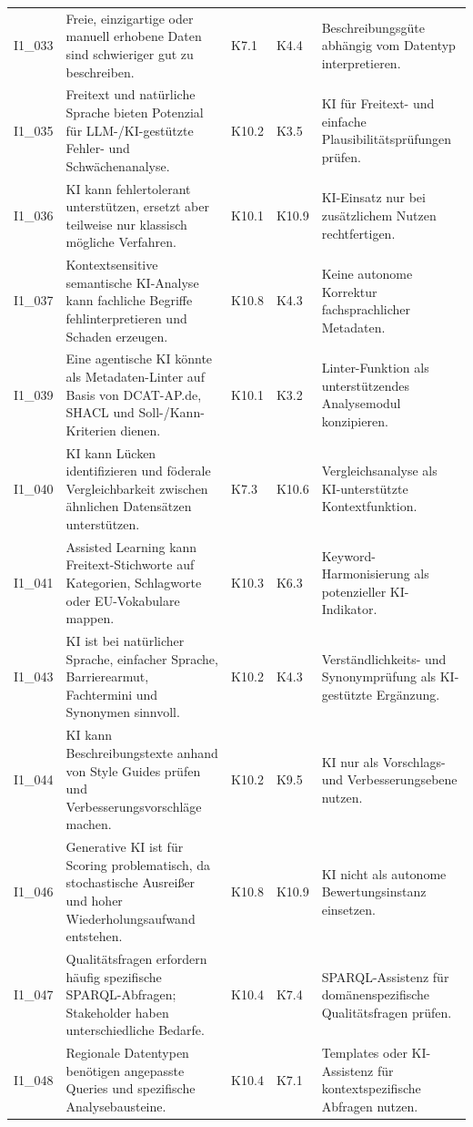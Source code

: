 \begin{longtable}{p{0.9cm} p{6cm} p{0.9cm} p{0.9cm} p{6cm}}
I1\_033 & Freie, einzigartige oder manuell erhobene Daten sind schwieriger gut zu beschreiben. & K7.1 & K4.4 & Beschreibungsgüte abhängig vom Datentyp interpretieren. \\
I1\_035 & Freitext und natürliche Sprache bieten Potenzial für LLM-/KI-gestützte Fehler- und Schwächenanalyse. & K10.2 & K3.5 & KI für Freitext- und einfache Plausibilitätsprüfungen prüfen. \\
I1\_036 & KI kann fehlertolerant unterstützen, ersetzt aber teilweise nur klassisch mögliche Verfahren. & K10.1 & K10.9 & KI-Einsatz nur bei zusätzlichem Nutzen rechtfertigen. \\
I1\_037 & Kontextsensitive semantische KI-Analyse kann fachliche Begriffe fehlinterpretieren und Schaden erzeugen. & K10.8 & K4.3 & Keine autonome Korrektur fachsprachlicher Metadaten. \\
I1\_039 & Eine agentische KI könnte als Metadaten-Linter auf Basis von DCAT-AP.de, SHACL und Soll-/Kann-Kriterien dienen. & K10.1 & K3.2 & Linter-Funktion als unterstützendes Analysemodul konzipieren. \\
I1\_040 & KI kann Lücken identifizieren und föderale Vergleichbarkeit zwischen ähnlichen Datensätzen unterstützen. & K7.3 & K10.6 & Vergleichsanalyse als KI-unterstützte Kontextfunktion. \\
I1\_041 & Assisted Learning kann Freitext-Stichworte auf Kategorien, Schlagworte oder EU-Vokabulare mappen. & K10.3 & K6.3 & Keyword-Harmonisierung als potenzieller KI-Indikator. \\
I1\_043 & KI ist bei natürlicher Sprache, einfacher Sprache, Barrierearmut, Fachtermini und Synonymen sinnvoll. & K10.2 & K4.3 & Verständlichkeits- und Synonymprüfung als KI-gestützte Ergänzung. \\
I1\_044 & KI kann Beschreibungstexte anhand von Style Guides prüfen und Verbesserungsvorschläge machen. & K10.2 & K9.5 & KI nur als Vorschlags- und Verbesserungsebene nutzen. \\
I1\_046 & Generative KI ist für Scoring problematisch, da stochastische Ausreißer und hoher Wiederholungsaufwand entstehen. & K10.8 & K10.9 & KI nicht als autonome Bewertungsinstanz einsetzen. \\
I1\_047 & Qualitätsfragen erfordern häufig spezifische SPARQL-Abfragen; Stakeholder haben unterschiedliche Bedarfe. & K10.4 & K7.4 & SPARQL-Assistenz für domänenspezifische Qualitätsfragen prüfen. \\
I1\_048 & Regionale Datentypen benötigen angepasste Queries und spezifische Analysebausteine. & K10.4 & K7.1 & Templates oder KI-Assistenz für kontextspezifische Abfragen nutzen. \\

\end{longtable}
